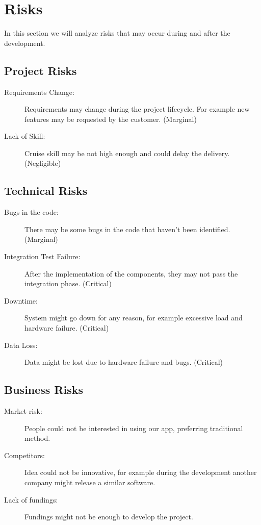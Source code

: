 \section{Risks}

In this section we will analyze risks that may occur during and after the development.

\subsection{Project Risks}

\begin{description}
	\item[Requirements Change:] Requirements may change during the project lifecycle. For example new features may be requested by the customer. (Marginal)
	\item[Lack of Skill:] Cruise skill may be not high enough and could delay the delivery. (Negligible)
\end{description}

\subsection{Technical Risks}

\begin{description}
	\item[Bugs in the code:] There may be some bugs in the code that haven't been identified. (Marginal)
	\item[Integration Test Failure:] After the implementation of the components, they may not pass the integration phase. (Critical)
	\item[Downtime:] System might go down for any reason, for example excessive load and hardware failure. (Critical)
	\item[Data Loss:] Data might be lost due to hardware failure and bugs. (Critical)
\end{description}

\subsection{Business Risks}
\begin{description}
	\item[Market risk:] People could not be interested in using our app, preferring traditional method.
	\item[Competitors:] Idea could not be innovative, for example during the development another company might release a similar software.	
	\item[Lack of fundings:] Fundings might not be enough to develop the project.
\end{description}